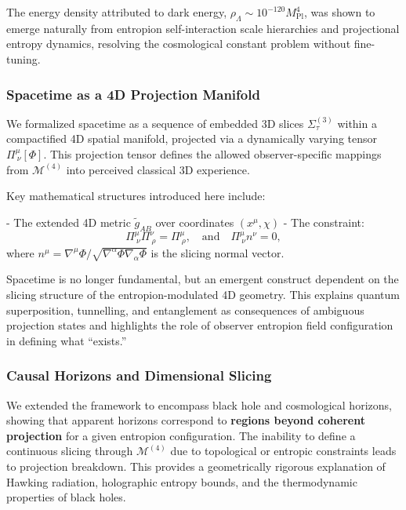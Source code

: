 \documentclass[12pt]{article}
\begin{document}
The energy density attributed to dark energy, $\rho_\Lambda \sim 10^{-120} M_{\text{Pl}}^4$, was shown to emerge naturally from entropion self-interaction scale hierarchies and projectional entropy dynamics, resolving the cosmological constant problem without fine-tuning.

\subsubsection*{Spacetime as a 4D Projection Manifold}

We formalized spacetime as a sequence of embedded 3D slices $\Sigma^{(3)}_\tau$ within a compactified 4D spatial manifold, projected via a dynamically varying tensor $\Pi^\mu_{\ \nu}[\Phi]$. This projection tensor defines the allowed observer-specific mappings from $\mathcal{M}^{(4)}$ into perceived classical 3D experience.

Key mathematical structures introduced here include:

- The extended 4D metric $\tilde{g}_{AB}$ over coordinates $(x^\mu, \chi)$
- The constraint:
  \begin{equation}
  \Pi^\mu_{\ \nu} \Pi^\nu_{\ \rho} = \Pi^\mu_{\ \rho}, \quad \text{and} \quad \Pi^\mu_{\ \nu} n^\nu = 0,
  \label{eq:projection-properties}
  \end{equation}
  where $n^\mu = \nabla^\mu \Phi / \sqrt{\nabla^\alpha \Phi \nabla_\alpha \Phi}$ is the slicing normal vector.

Spacetime is no longer fundamental, but an emergent construct dependent on the slicing structure of the entropion-modulated 4D geometry. This explains quantum superposition, tunnelling, and entanglement as consequences of ambiguous projection states and highlights the role of observer entropion field configuration in defining what “exists.”

\subsubsection*{Causal Horizons and Dimensional Slicing}

We extended the framework to encompass black hole and cosmological horizons, showing that apparent horizons correspond to \textbf{regions beyond coherent projection} for a given entropion configuration. The inability to define a continuous slicing through $\mathcal{M}^{(4)}$ due to topological or entropic constraints leads to projection breakdown. This provides a geometrically rigorous explanation of Hawking radiation, holographic entropy bounds, and the thermodynamic properties of black holes.
\end{document}
